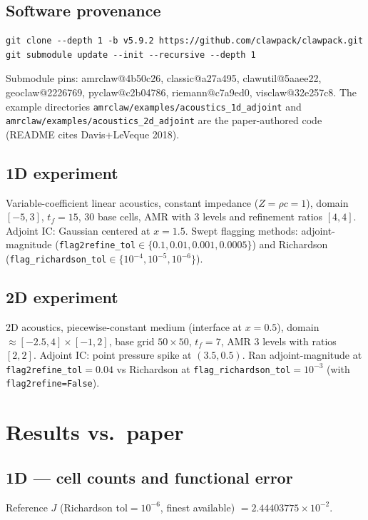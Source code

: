 \documentclass[11pt]{article}
\begin{document}
\subsection{Software provenance}
\begin{lstlisting}
git clone --depth 1 -b v5.9.2 https://github.com/clawpack/clawpack.git
git submodule update --init --recursive --depth 1
\end{lstlisting}
Submodule pins: amrclaw@4b50c26, classic@a27a495, clawutil@5aaee22,
geoclaw@2226769, pyclaw@c2b04786, riemann@c7a9ed0, visclaw@32e257c8. The
example directories \texttt{amrclaw/examples/acoustics\_1d\_adjoint} and
\texttt{amrclaw/examples/acoustics\_2d\_adjoint} are the paper-authored code
(README cites Davis+LeVeque 2018).

\subsection{1D experiment}
Variable-coefficient linear acoustics, constant impedance
($Z = \rho c = 1$), domain $[-5, 3]$, $t_f=15$, 30 base cells, AMR with 3 levels
and refinement ratios $[4,4]$. Adjoint IC: Gaussian centered at $x=1.5$.
Swept flagging methods: adjoint-magnitude
(\texttt{flag2refine\_tol}$\in\{0.1, 0.01, 0.001, 0.0005\}$) and
Richardson (\texttt{flag\_richardson\_tol}$\in\{10^{-4}, 10^{-5}, 10^{-6}\}$).

\subsection{2D experiment}
2D acoustics, piecewise-constant medium (interface at $x=0.5$), domain
$\approx [-2.5, 4]\times[-1, 2]$, base grid $50\times50$, $t_f=7$, AMR 3 levels
with ratios $[2,2]$. Adjoint IC: point pressure spike at $(3.5, 0.5)$.
Ran adjoint-magnitude at \texttt{flag2refine\_tol}$=0.04$ vs Richardson at
\texttt{flag\_richardson\_tol}$=10^{-3}$ (with \texttt{flag2refine=False}).

\section{Results vs.\ paper}

\subsection{1D --- cell counts and functional error}
Reference $J$ (Richardson tol$=10^{-6}$, finest available) $= 2.44403775\times 10^{-2}$.
\end{document}
